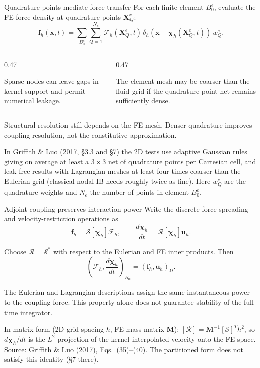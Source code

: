 \documentclass[aspectratio=169,11pt]{beamer}
\newcommand{\xvec}{\bm{x}}
\newcommand{\Xvec}{\bm{X}}
\newcommand{\uvec}{\bm{u}}
\newcommand{\fvec}{\bm{f}}
\newcommand{\lforce}{\bm{\mathcal{F}}}
\begin{document}
\begin{frame}{Quadrature points mediate force transfer}
\small
For each finite element \(B_0^e\), evaluate the FE force density at quadrature points \(\Xvec_Q^e\):
\[
\boxed{
\fvec_h(\xvec,t)=
\sum_{B_0^e}\sum_{Q=1}^{N_e}
\lforce_h(\Xvec_Q^e,t)\,
\delta_h\!\left(\xvec-\bm{\chi}_h(\Xvec_Q^e,t)\right)\,w_Q^e.}
\]

\medskip
\begin{columns}[T,onlytextwidth]
\begin{column}{0.47\textwidth}

Sparse nodes can leave gaps in kernel support and permit numerical leakage.
\end{column}
\begin{column}{0.47\textwidth}

The element mesh may be coarser than the fluid grid if the quadrature-point net remains sufficiently dense.
\end{column}
\end{columns}

\vfill
{\scriptsize Structural resolution still depends on the FE mesh. Denser quadrature improves coupling resolution, not the constitutive approximation.\par
\color{DarkGray}In Griffith \& Luo (2017, \S3.3 and \S7) the 2D tests use adaptive Gaussian rules giving on average at least a \(3\times3\) net of quadrature points per Cartesian cell, and leak-free results with Lagrangian meshes at least four times coarser than the Eulerian grid (classical nodal IB needs roughly twice as fine). Here \(w_Q^e\) are the quadrature weights and \(N_e\) the number of points in element \(B_0^e\).\par}
\end{frame}

\begin{frame}{Adjoint coupling preserves interaction power}
Write the discrete force-spreading and velocity-restriction operations as
\[
\fvec_h=\mathcal{S}[\bm{\chi}_h]\lforce_h,
\qquad
\frac{d\bm{\chi}_h}{dt}=\mathcal{R}[\bm{\chi}_h]\uvec_h.
\]

Choose \(\mathcal{R}=\mathcal{S}^{*}\) with respect to the Eulerian and FE inner products. Then
\[
\boxed{
\left(\lforce_h,\frac{d\bm{\chi}_h}{dt}\right)_{B_0}
=\left(\fvec_h,\uvec_h\right)_{\Omega}.}
\]

\begin{punchbox}
The Eulerian and Lagrangian descriptions assign the same instantaneous power to the coupling force. This property alone does not guarantee stability of the full time integrator.
\end{punchbox}

\vfill
{\scriptsize\color{DarkGray}In matrix form (2D grid spacing \(h\), FE mass matrix \(\bm{M}\)): \([\mathcal{R}]=\bm{M}^{-1}[\mathcal{S}]^{T}h^{2}\), so \(d\bm{\chi}_h/dt\) is the \(L^2\) projection of the kernel-interpolated velocity onto the FE space. Source: Griffith \& Luo (2017), Eqs.~(35)--(40). The partitioned form does not satisfy this identity (\S7 there).\par}
\end{frame}
\end{document}
